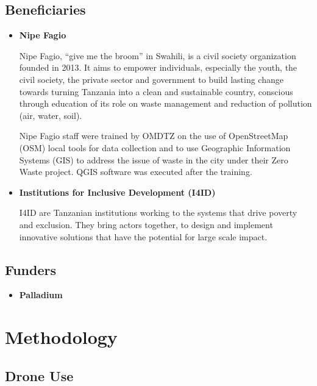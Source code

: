 \documentclass[a4paper,12pt,twoside]{article}
\begin{document}
\subsection{Beneficiaries}

    \begin{itemize}
        \item \textbf{Nipe Fagio}
    
        Nipe Fagio, “give me the broom” in Swahili, is a civil society organization founded in 2013. It aims to empower individuals, especially the youth, the civil society, the private sector and government to build lasting change towards turning Tanzania into a clean and sustainable country, conscious through education of its role on waste management and reduction of pollution (air, water, soil).
    
        Nipe Fagio staff were trained by OMDTZ on the use of OpenStreetMap (OSM) local tools for data collection and to use Geographic Information Systems (GIS) to address the issue of waste in the city under their Zero Waste project. QGIS software was executed after the training.

        \item \textbf{Institutions for Inclusive Development (I4ID)}
    
        I4ID are Tanzanian institutions working to the systems that drive poverty and exclusion. They bring actors together, to design and implement innovative solutions that have the potential for large scale impact.
    
    \end{itemize}

\subsection{Funders}

    \begin{itemize}
        \item \textbf{Palladium}
    
        \lipsum[0-1]
    
    \end{itemize}   

\section{Methodology}

\subsection{Drone Use}
\end{document}
